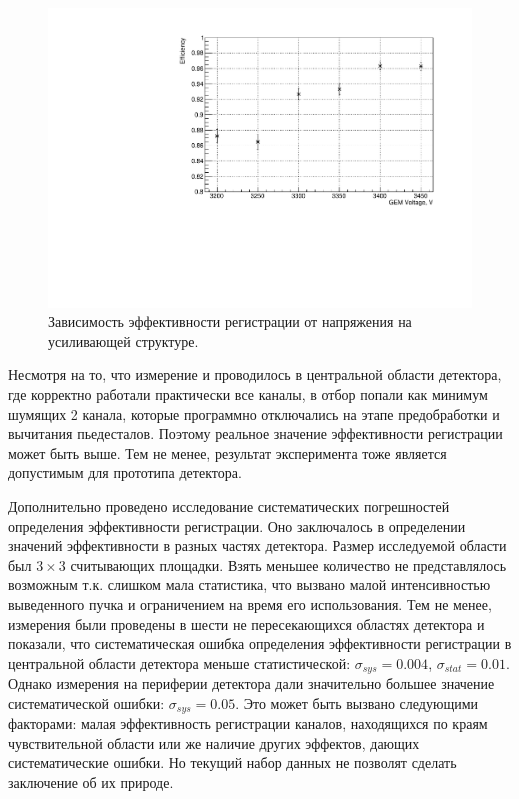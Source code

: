 \begin{figure}[h]
	\centering
	\includegraphics[width= 12cm]{img/eff_plot.pdf}
	\caption{Зависимость эффективности регистрации от напряжения на усиливающей структуре.}
	\label{fig:eff_gr}
\end{figure}
Несмотря на то, что измерение и проводилось в центральной области детектора, где корректно работали практически все каналы, в отбор попали как минимум шумящих 2 канала, которые программно отключались на этапе предобработки и вычитания пьедесталов. Поэтому реальное значение эффективности регистрации может быть выше. Тем не менее, результат эксперимента тоже является допустимым для прототипа детектора.  
\par Дополнительно проведено исследование систематических погрешностей определения эффективности регистрации. Оно заключалось в определении значений эффективности в разных частях детектора. Размер исследуемой области был $3\times3$ считывающих площадки. Взять меньшее количество не представлялось возможным т.к. слишком мала статистика, что вызвано малой интенсивностью выведенного пучка и ограничением на время его использования. Тем не менее, измерения были проведены в шести не пересекающихся областях детектора и показали, что систематическая ошибка определения эффективности регистрации в центральной области детектора меньше статистической: $\sigma_{sys} = 0.004$, $\sigma_{stat} = 0.01$. Однако измерения на периферии детектора дали значительно большее значение систематической ошибки: $\sigma_{sys} = 0.05$. Это может быть вызвано следующими факторами: малая эффективность регистрации каналов, находящихся по краям чувствительной области или же наличие других эффектов, дающих систематические ошибки. Но текущий набор данных не позволят сделать заключение об их природе. 

